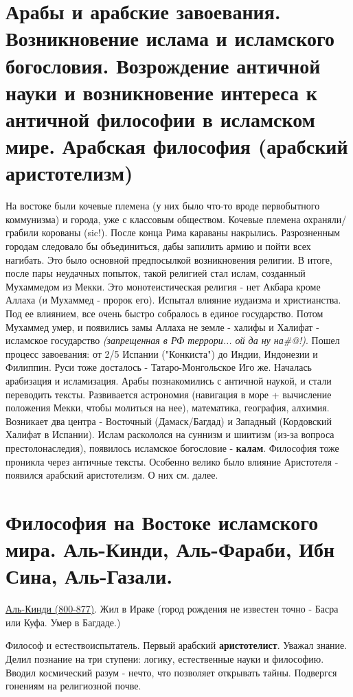 \section{Арабы и арабские завоевания. Возникновение ислама и исламского богословия. Возрождение античной науки и возникновение интереса к античной философии в исламском мире. Арабская философия (арабский аристотелизм)}
На востоке были кочевые племена (у них было что-то вроде первобытного коммунизма) и города, уже с классовым обществом.
Кочевые племена охраняли/грабили корованы (sic!). После конца Рима караваны накрылись.
Разрозненным городам следовало бы объединиться, дабы запилить армию и пойти всех нагибать. 
Это было основной предпосылкой возникновения религии. 
В итоге, после пары неудачных попыток, такой религией стал ислам, созданный Мухаммедом из Мекки.
Это монотеистическая религия - нет Акбара кроме Аллаха (и Мухаммед - пророк его). 
Испытал влияние иудаизма и христианства. 
Под ее влиянием, все очень быстро собралось в единое государство. Потом Мухаммед умер, и появились замы Аллаха не земле - халифы и Халифат - исламское государство \textit{(запрещенная в РФ террори... ой да ну на\#@!)}. 
Пошел процесс завоевания: от 2/5 Испании ("Конкиста") до Индии, Индонезии и Филиппин.
Руси тоже досталось - Татаро-Монгольское Иго же. 
Началась арабизация и исламизация. 
Арабы познакомились с античной наукой, и стали переводить тексты. 
Развивается астрономия (навигация в море + вычисление положения Мекки, чтобы молиться на нее), математика, география, алхимия. 
Возникает два центра - Восточный (Дамаск/Багдад) и Западный (Кордовский Халифат в Испании).
Ислам раскололся на суннизм и шиитизм (из-за вопроса престолонаследия), появилось исламское богословие - \textbf{калам}. 
Философия тоже проникла через античные тексты. Особенно велико было влияние Аристотеля - появился арабский аристотелизм. О них см. далее.

\section{Философия на Востоке исламского мира. Аль-Кинди, Аль-Фараби, Ибн Сина, Аль-Газали.}
\hspace{8pt} 
\underline{Аль-Кинди (800-877)}. Жил в Ираке (город рождения не известен точно - Басра или Куфа. Умер в Багдаде.)

Философ и естествоиспытатель. Первый арабский \textbf{аристотелист}. Уважал знание. Делил познание на три ступени: логику, естественные науки и философию. Вводил космический разум - нечто, что позволяет открывать тайны. Подвергся гонениям на религиозной почве.

